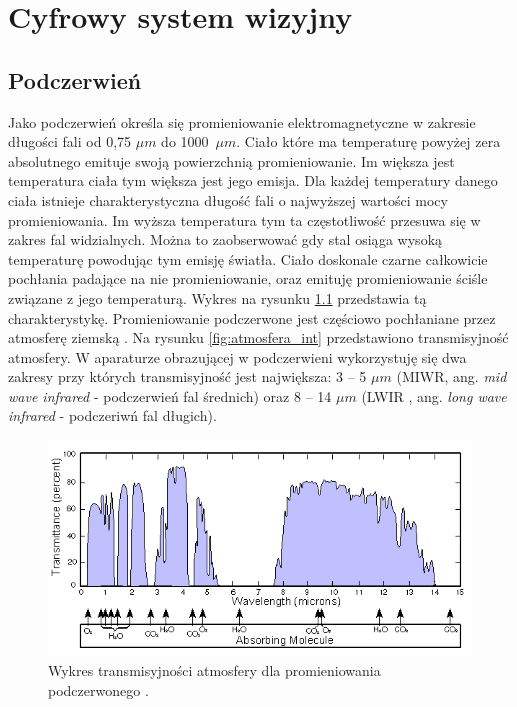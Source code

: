 \chapter{Cyfrowy system wizyjny}
\label{cha:csw}

\section{Podczerwień}

Jako podczerwień określa się promieniowanie elektromagnetyczne w zakresie długości fali od  0,75 $\mu m$ do 1000~$\mu m$. Ciało które ma temperaturę powyżej zera absolutnego emituje swoją powierzchnią promieniowanie. Im większa jest temperatura ciała tym większa jest jego emisja. Dla każdej temperatury danego ciała istnieje charakterystyczna długość fali o najwyższej wartości mocy promieniowania. Im wyższa temperatura tym ta częstotliwość przesuwa się w zakres fal widzialnych. Można to zaobserwować gdy stal osiąga wysoką temperaturę powodując tym emisję światła. Ciało doskonale czarne całkowicie pochłania padające na nie promieniowanie, oraz emituję promieniowanie ściśle związane z jego temperaturą. Wykres na rysunku \ref{fig:perfect_black}  przedstawia tą charakterystykę. Promieniowanie podczerwone jest częściowo pochłaniane przez atmosferę ziemską . Na rysunku  \ref{fig:atmosfera_int} przedstawiono transmisyjność atmosfery. W aparaturze obrazującej w podczerwieni wykorzystuję się dwa zakresy przy których transmisyjność jest największa:  3 -- 5 $\mu m$ (MIWR, ang. \textit{mid wave infrared} - podczerwień fal średnich) oraz  8 -- 14 $\mu m$ (LWIR , ang. \textit{long wave infrared} - podczeriwń fal długich)\cite{niklaus2007mems}.

\begin{figure}
\centering
\includegraphics[width=0.8\linewidth]{images/Atmosfaerisk_spredning}
\caption[Wykres transmisyjności atmosfery dla promieniowania podczerwonego ]{Wykres transmisyjności atmosfery dla promieniowania podczerwonego \cite{wiki:infrared}.}
\label{fig:perfect_black}
\end{figure}

